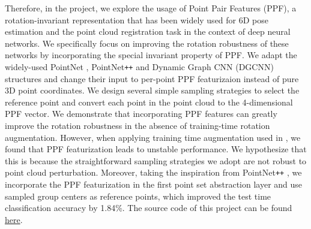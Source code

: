 \documentclass{article}
\begin{document}
Therefore, in the project, we explore the usage of Point Pair Features (PPF), a rotation-invariant representation that has been widely used for 6D pose estimation and the point cloud registration task in the context of deep neural networks. We specifically focus on improving the rotation robustness of these networks by incorporating the special invariant property of PPF. 
We adapt the widely-used PointNet \cite{Qi2017pointnet}, PointNet\texttt{++} \cite{qi2017pointnet2} and Dynamic Graph CNN (DGCNN) \cite{Wang2019-dgcnn} structures and change their input to per-point PPF featurizaion instead of pure 3D point coordinates. 
We design several simple sampling strategies to select the reference point and convert each point in the point cloud to the 4-dimensional PPF vector. We demonstrate that incorporating PPF features can greatly improve the rotation robustness in the absence of training-time rotation augmentation. 
However, when applying training time augmentation used in \cite{qi2017pointnet2}, we found that PPF featurization leads to unstable performance. We hypothesize that this is because the straightforward sampling strategies we adopt are not robust to point cloud perturbation.
Moreover, taking the inspiration from PointNet\texttt{++} \cite{qi2017pointnet2}, we incorporate the PPF featurization in the first point set abstraction layer and use sampled group centers as reference points, which improved the test time classification accuracy by 1.84\%. The source code of this project can be found \href{http://www.overleaf.com}{here}. 


\end{document}

